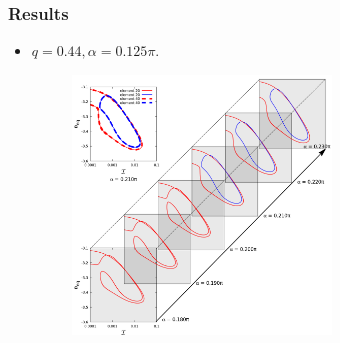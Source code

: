 \documentclass{beamer}
\begin{document}
\begin{frame}
	\frametitle{Results}
	\begin{overlayarea}{\textwidth}{\textheight}
\begin{itemize}
	\item $q=0.44, \alpha=0.125\pi$.
	\begin{figure}[htb]
		\begin{center}
			\includegraphics[width=0.65\textwidth]{plots/elastic_beam_I_theta_q_0.400_alpha.png}
		\end{center}
	\end{figure}
\end{itemize}
	\end{overlayarea}
\end{frame}

\end{document}
